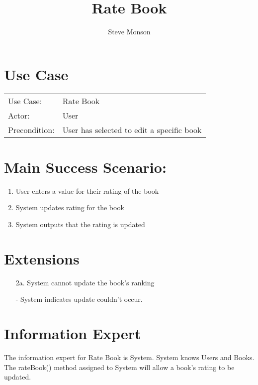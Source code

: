 \documentclass{article}
\title{Rate Book}
\author{Steve Monson}
\begin{document}
\maketitle

\section*{Use Case}

\begin{tabular}{l l}
Use Case:     & Rate Book \\
Actor:        & User \\
Precondition: & User has selected to edit a specific book \\
\end{tabular}

\section*{Main Success Scenario:}

\begin{enumerate}
    \item User enters a value for their rating of the book
    \item System updates rating for the book
    \item System outputs that the rating is updated
\end{enumerate}

\section*{Extensions}

\begin{itemize}
    \item [2a.] System cannot update the book's ranking
       
    - System indicates update couldn't occur.
\end{itemize}

\section*{Information Expert}

The information expert for Rate Book is System.
System knows Users and Books.
The rateBook() method assigned to System will allow a book's rating to be updated.
\end{document}
